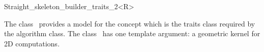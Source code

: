 

\begin{ccRefClass}{Straight_skeleton_builder_traits_2<R>}


\ccDefinition

The class \ccRefName\ provides a model for the
 concept which is the traits class
required by the  algorithm class. The class 
\ccRefName\ has one template argument: a geometric kernel for 2D computations.


\ccIsModel
{}\\
\\
\\

\ccSeeAlso
{}

\end{ccRefClass}


